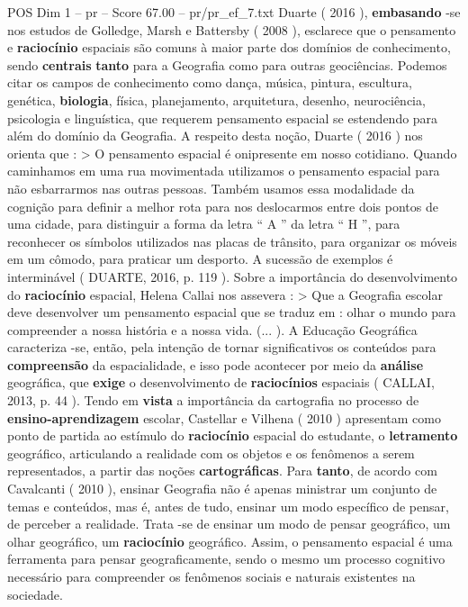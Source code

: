 \begin{textsample}{POS Dim 1 – pr – Score 67.00 – pr/pr\_ef\_7.txt}
Duarte ( 2016 ), \textbf{embasando} -se nos estudos de Golledge, Marsh e Battersby ( 2008 ), esclarece que o pensamento e \textbf{raciocínio} espaciais são comuns à maior parte dos domínios de conhecimento, sendo \textbf{centrais} \textbf{tanto} para a Geografia como para outras geociências.
Podemos citar os campos de conhecimento como dança, música, pintura, escultura, genética, \textbf{biologia}, física, planejamento, arquitetura, desenho, neurociência, psicologia e linguística, que requerem pensamento espacial se estendendo para além do domínio da Geografia.
A respeito desta noção, Duarte ( 2016 ) nos orienta que : > O pensamento espacial é onipresente em nosso cotidiano.
Quando caminhamos em uma rua movimentada utilizamos o pensamento espacial para não esbarrarmos nas outras pessoas.
Também usamos essa modalidade da cognição para definir a melhor rota para nos deslocarmos entre dois pontos de uma cidade, para distinguir a forma da letra “ A ” da letra “ H ”, para reconhecer os símbolos utilizados nas placas de trânsito, para organizar os móveis em um cômodo, para praticar um desporto.
A sucessão de exemplos é interminável ( DUARTE, 2016, p. 119 ).
Sobre a importância do desenvolvimento do \textbf{raciocínio} espacial, Helena Callai nos assevera : > Que a Geografia escolar deve desenvolver um pensamento espacial que se traduz em : olhar o mundo para compreender a nossa história e a nossa vida. (... ).
A Educação Geográfica caracteriza -se, então, pela intenção de tornar significativos os conteúdos para \textbf{compreensão} da espacialidade, e isso pode acontecer por meio da \textbf{análise} geográfica, que \textbf{exige} o desenvolvimento de \textbf{raciocínios} espaciais ( CALLAI, 2013, p. 44 ).
Tendo em \textbf{vista} a importância da cartografia no processo de \textbf{ensino-aprendizagem} escolar, Castellar e Vilhena ( 2010 ) apresentam como ponto de partida ao estímulo do \textbf{raciocínio} espacial do estudante, o \textbf{letramento} geográfico, articulando a realidade com os objetos e os fenômenos a serem representados, a partir das noções \textbf{cartográficas}.
Para \textbf{tanto}, de acordo com Cavalcanti ( 2010 ), ensinar Geografia não é apenas ministrar um conjunto de temas e conteúdos, mas é, antes de tudo, ensinar um modo específico de pensar, de perceber a realidade.
Trata -se de ensinar um modo de pensar geográfico, um olhar geográfico, um \textbf{raciocínio} geográfico.
Assim, o pensamento espacial é uma ferramenta para pensar geograficamente, sendo o mesmo um processo cognitivo necessário para compreender os fenômenos sociais e naturais existentes na sociedade.

\end{textsample}
